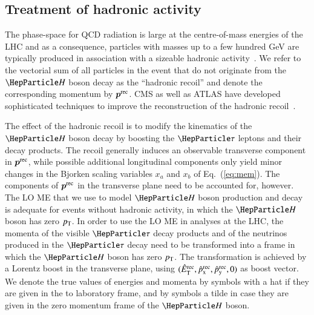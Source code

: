 \subsection{Treatment of hadronic activity}
\label{sec:mem_hadRecoil}

The phase-space for QCD radiation is large at the centre-of-mass
energies of the LHC
and as a consequence, particles with masses up to a few hundred GeV 
are typically produced in association with a sizeable hadronic activity~\cite{Alwall:2010cq}.
We refer to the vectorial sum of all particles in the event that do not originate from the $\PHiggs$ boson decay
as the ``hadronic recoil'' and denote the corresponding momentum by $\bm{p}^{\textrm{rec}}$.
CMS as well as ATLAS have developed sophisticated techniques to improve the reconstruction 
of the hadronic recoil~\cite{CMS-JME-13-003,ATLAS-CONF-2014-019}.

The effect of the hadronic recoil is to modify the kinematics of the $\PHiggs$ boson decay
by boosting the $\Pgt$ leptons and their decay products. The recoil generally induces an observable transverse component in $\bm{p}^{\textrm{rec}}$, while possible additional longitudinal components only yield minor changes in the Bjorken scaling variables $x_{a}$ and $x_{b}$ of Eq.~(\ref{eq:mem}).
The components of $\bm{p}^{\textrm{rec}}$ in the transverse plane need to be accounted for, however.
The LO ME that we use to model $\PHiggs$ boson production and decay
is adequate for events without hadronic activity,
in which the $\PHiggs$ boson has zero $p_{\textrm{T}}$.
In order to use the LO ME in analyses at the LHC,
the momenta of the visible $\Pgt$ decay products and of the neutrinos produced in the $\Pgt$ decay
need to be transformed into a frame in which the $\PHiggs$ boson has zero $p_{\textrm{T}}$.
The transformation is achieved by a Lorentz boost in the transverse plane,
using $(\hat{E}_{\textrm{T}}^{\textrm{rec}}, \hat{p}_{\textrm{x}}^{\textrm{rec}}, \hat{p}_{\textrm{y}}^{\textrm{rec}}, 0)$ as boost
vector.
We denote the true values of energies and momenta by symbols with a
hat if they are given in the to laboratory frame, and by symbols a tilde in case they are given in the zero momentum frame of the $\PHiggs$ boson.

